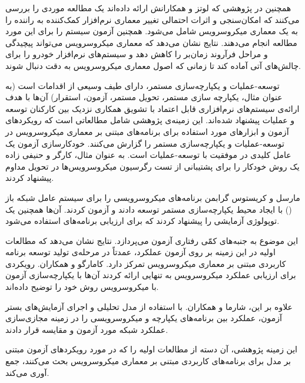همچنین در پژوهشی که لوتز و همکارانش ارائه داده‌اند یک مطالعه موردی را بررسی می‌کنند که امکان‌سنجی و اثرات احتمالی تغییر معماری نرم‌افزار کمک‌کننده به راننده را به یک معماری میکروسرویس شامل می‌شود. همچنین آزمون سیستم را برای این مورد مطالعه انجام می‌دهند. نتایج نشان می‌دهد که معماری‌ میکروسرویس می‌تواند پیچیدگی و مراحل فرآروند زمان‌بر را کاهش دهد و سیستم‌های نرم‌افزار خودرو را برای چالش‌های آتی آماده کند تا زمانی که اصول معماری‌ میکروسرویس به دقت دنبال شوند. 

توسعه-عملیات و یکپارچه‌سازی مستمر، دارای طیف وسیعی از اقدامات است (به عنوان مثال، یکپارچه سازی مستمر، تحویل مستمر، آزمون، استقرار) آن‌ها با هدف ارائه‌ی سیستم‌های نرم‌افزاری قابل اعتماد با تشویق همکاری نزدیک بین کارکنان توسعه و عملیات پیشنهاد شده‌اند. این زمینه‌ی پژوهشی شامل مطالعاتی است که رویکردهای آزمون و ابزارهای مورد استفاده برای برنامه‌های مبتنی بر معماری میکروسرویس در توسعه-عملیات و یکپارچه‌سازی مستمر را گزارش می‌کنند. خودکارسازی آزمون یک عامل کلیدی در موفقیت با توسعه-عملیات است. به عنوان مثال، کارگر و حنیفی زاده یک روش خودکار را برای پشتیبانی از تست رگرسیون میکروسرویس‌ها در تحویل مداوم پیشنهاد کردند.

مارسل و کریستوس گرابمن برنامه‌های میکروسرویسی را برای سیستم عامل شبکه باز () با ایجاد محیط یکپارچه‌سازی مستمر توسعه دادند و آزمون کردند. آن‌ها همچنین یک توپولوژی آزمایشی را پیشنهاد کردند که برای ارزیابی برنامه‌های  استفاده می‌شود.

این موضوع به جنبه‌های کمّی رفتاری آزمون می‌پردازد. نتایج نشان می‌دهد که مطالعات اولیه در این زمینه‌‌ بر روی آزمون عملکرد، عمدتاً در مرحله‌ی تولید توسعه برنامه کاربردی مبتنی بر معماری میکروسرویس تمرکز دارد. 
کامارگو و همکاران. رویکردی برای ارزیابی عملکرد میکروسرویس به تنهایی ارائه کردند آن‌ها با یکپارچه‌سازی آزمون با میکروسرویس روش خود را توضیح داده‌اند.

علاوه بر این، شارما و همکاران. با استفاده از مدل تحلیلی و اجرای آزمایش‌های بستر آزمون، عملکرد بین برنامه‌های یکپارچه و میکروسرویسی را در زمینه مجازی‌سازی عملکرد شبکه مورد آزمون و مقایسه قرار دادند.

 این زمینه پژوهشی، آن دسته از مطالعات اولیه را که در مورد رویکردهای آزمون مبتنی بر مدل برای برنامه‌های کاربردی مبتنی بر معماری میکروسرویس بحث می‌کنند، جمع آوری می‌کند. 
 
